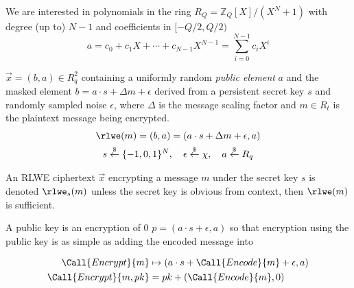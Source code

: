 \begin{definition}
    We are interested in polynomials in the ring $R_Q = \mathbb{Z}_Q[X]/(X^N+1)$ with degree (up to) $N - 1$ and coefficients in $[-Q/2, Q/2)$ 
    \begin{equation}
        \label{form:canonical}
        a = c_0 + c_1X + \cdots + c_{N-1}X^{N-1} = \sum_{i=0}^{N-1} c_iX^i
    \end{equation}
\end{definition}

\begin{definition} $\vec{x} = (b,a) \in R_q^2$ containing a uniformly random \textit{public element} $a$ and the masked element $b = a\cdot s + \Delta m + \epsilon$ derived from a persistent secret key $s$ and randomly sampled noise $\epsilon$, where $\Delta$ is the message scaling factor and $m\in R_t$ is the plaintext message being encrypted.
    \begin{gather} %
        \label{def:rlwe}
        \rlwe(m) = (b, a) = (a\cdot s + \Delta m + \epsilon, a) \\
        s \overset{\$}{\leftarrow} \{-1,0,1\}^N,\quad \epsilon \overset{\$}{\leftarrow} \chi, \quad a \overset{\$}{\leftarrow} R_q
    \end{gather}

    An RLWE ciphertext $\vec{x}$ encrypting a message $m$ under the secret key $s$ is denoted $\rlwe_s(m)$ unless the secret key is obvious from context, then $\rlwe(m)$ is sufficient.
\end{definition}

\begin{definition}
    A public key is an encryption of 0 $p = (a\cdot s + \epsilon, a)$ so that encryption using the public key is as simple as adding the encoded message into 
\end{definition}

\begin{definition}[Encryption]
    \begin{align}
        \Call{Encrypt}{m} &\mapsto (a\cdot s + \Call{Encode}{m} + \epsilon, a) \\
        \Call{Encrypt}{m, pk} &= pk + (\Call{Encode}{m}, 0)
    \end{align}
\end{definition}

